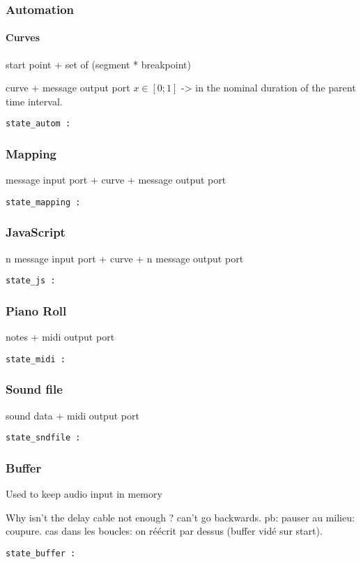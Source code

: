 \documentclass[applsci,article,submit,moreauthors,pdftex,10pt,a4paper]{mdpi}
\begin{document}
\subsubsection{Automation}
\paragraph{Curves}
start point + set of (segment * breakpoint)

curve + message output port
$x\in[0;1]$ -> in the nominal duration of the parent time interval.

\begin{lstlisting}
state_autom :
\end{lstlisting}
\subsubsection{Mapping}
message input port + curve + message output port
\begin{lstlisting}
state_mapping :
\end{lstlisting}
\subsubsection{JavaScript}
n message input port + curve + n message output port
\begin{lstlisting}
state_js :
\end{lstlisting}
\subsubsection{Piano Roll}
notes + midi output port
\begin{lstlisting}
state_midi :
\end{lstlisting}
\subsubsection{Sound file}
sound data + midi output port
\begin{lstlisting}
state_sndfile :
\end{lstlisting}
\subsubsection{Buffer}
Used to keep audio input in memory

Why isn't the delay cable not enough ? can't go backwards. 
pb: pauser au milieu: coupure. cas dans les boucles: on réécrit par dessus (buffer vidé sur start).
\begin{lstlisting}
state_buffer :
\end{lstlisting}
\end{document}
